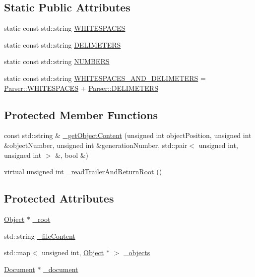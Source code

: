 \subsection*{Static Public Attributes}
\begin{DoxyCompactItemize}
\item 
static const std\-::string \hyperlink{classmerge__lib_1_1_parser_aeae49355a210d0171da32858c4af858b}{W\-H\-I\-T\-E\-S\-P\-A\-C\-E\-S}
\item 
static const std\-::string \hyperlink{classmerge__lib_1_1_parser_af4079dd0bf5d8d17a714b32b6d82a62b}{D\-E\-L\-I\-M\-E\-T\-E\-R\-S}
\item 
static const std\-::string \hyperlink{classmerge__lib_1_1_parser_a01f083b2ba8adb53f83734343c075458}{N\-U\-M\-B\-E\-R\-S}
\item 
static const std\-::string \hyperlink{classmerge__lib_1_1_parser_a470d149d6e6683e66d895e4a5afe1ba5}{W\-H\-I\-T\-E\-S\-P\-A\-C\-E\-S\-\_\-\-A\-N\-D\-\_\-\-D\-E\-L\-I\-M\-E\-T\-E\-R\-S} = \hyperlink{classmerge__lib_1_1_parser_aeae49355a210d0171da32858c4af858b}{Parser\-::\-W\-H\-I\-T\-E\-S\-P\-A\-C\-E\-S} + \hyperlink{classmerge__lib_1_1_parser_af4079dd0bf5d8d17a714b32b6d82a62b}{Parser\-::\-D\-E\-L\-I\-M\-E\-T\-E\-R\-S}
\end{DoxyCompactItemize}
\subsection*{Protected Member Functions}
\begin{DoxyCompactItemize}
\item 
const std\-::string \& \hyperlink{classmerge__lib_1_1_parser_a1189d2610c4c3ed58056ce9a0bc504b8}{\-\_\-get\-Object\-Content} (unsigned int object\-Position, unsigned int \&object\-Number, unsigned int \&generation\-Number, std\-::pair$<$ unsigned int, unsigned int $>$ \&, bool \&)
\item 
virtual unsigned int \hyperlink{classmerge__lib_1_1_parser_a59d3468e300a02465974908a98150779}{\-\_\-read\-Trailer\-And\-Return\-Root} ()
\end{DoxyCompactItemize}
\subsection*{Protected Attributes}
\begin{DoxyCompactItemize}
\item 
\hyperlink{classmerge__lib_1_1_object}{Object} $\ast$ \hyperlink{classmerge__lib_1_1_parser_a861ca5313f20519108b925eb1572e84c}{\-\_\-root}
\item 
std\-::string \hyperlink{classmerge__lib_1_1_parser_ad4811a7d46bb4b2795b22b4bef2f10bb}{\-\_\-file\-Content}
\item 
std\-::map$<$ unsigned int, \hyperlink{classmerge__lib_1_1_object}{Object} $\ast$ $>$ \hyperlink{classmerge__lib_1_1_parser_ac153e7f69cfb00ecd76d987f36dcb305}{\-\_\-objects}
\item 
\hyperlink{classmerge__lib_1_1_document}{Document} $\ast$ \hyperlink{classmerge__lib_1_1_parser_a960a35df87a3700cffd4dd2c64a76fa3}{\-\_\-document}
\end{DoxyCompactItemize}


